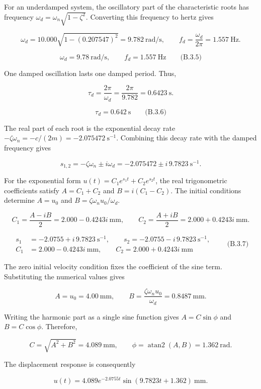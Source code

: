 For an underdamped system, the oscillatory part of the characteristic roots has frequency $\omega_d=\omega_n\sqrt{1-\zeta^2}$. Converting this frequency to hertz gives

\[
\omega_d=10.000\sqrt{1-(0.207547)^2}=9.782\ \mathrm{rad/s},
\qquad
f_d=\frac{\omega_d}{2\pi}=1.557\ \mathrm{Hz}.
\]

\[
\boxed{\omega_d=9.78\ \mathrm{rad/s},\qquad f_d=1.557\ \mathrm{Hz}}
\qquad\text{(B.3.5)}
\]

One damped oscillation lasts one damped period. Thus,

\[
\tau_d=\frac{2\pi}{\omega_d}=\frac{2\pi}{9.782}=0.6423\ \mathrm{s}.
\]

\[
\boxed{\tau_d=0.642\ \mathrm{s}}
\qquad\text{(B.3.6)}
\]

The real part of each root is the exponential decay rate $-\zeta\omega_n=-c/(2m)=-2.075472\ \mathrm{s^{-1}}$. Combining this decay rate with the damped frequency gives

\[
s_{1,2}=-\zeta\omega_n\pm i\omega_d=-2.075472\pm i\,9.7823\ \mathrm{s^{-1}}.
\]

For the exponential form $u(t)=C_1e^{s_1t}+C_2e^{s_2t}$, the real trigonometric coefficients satisfy $A=C_1+C_2$ and $B=i(C_1-C_2)$. The initial conditions determine $A=u_0$ and $B=\zeta\omega_nu_0/\omega_d$.

\[
C_1=\frac{A-iB}{2}=2.000-0.4243i\ \mathrm{mm},
\qquad
C_2=\frac{A+iB}{2}=2.000+0.4243i\ \mathrm{mm}.
\]

\[
\boxed{
\begin{aligned}
s_1&=-2.0755+i\,9.7823\ \mathrm{s^{-1}},\qquad
s_2=-2.0755-i\,9.7823\ \mathrm{s^{-1}},\\
C_1&=2.000-0.4243i\ \mathrm{mm},\qquad
C_2=2.000+0.4243i\ \mathrm{mm}
\end{aligned}}
\qquad\text{(B.3.7)}
\]

The zero initial velocity condition fixes the coefficient of the sine term. Substituting the numerical values gives

\[
A=u_0=4.00\ \mathrm{mm},
\qquad
B=\frac{\zeta\omega_nu_0}{\omega_d}=0.8487\ \mathrm{mm}.
\]

Writing the harmonic part as a single sine function gives $A=C\sin\phi$ and $B=C\cos\phi$. Therefore,

\[
C=\sqrt{A^2+B^2}=4.089\ \mathrm{mm},
\qquad
\phi=\operatorname{atan2}(A,B)=1.362\ \mathrm{rad}.
\]

The displacement response is consequently

\[
u(t)=4.089e^{-2.0755t}\sin(9.7823t+1.362)\ \mathrm{mm}.
\]

